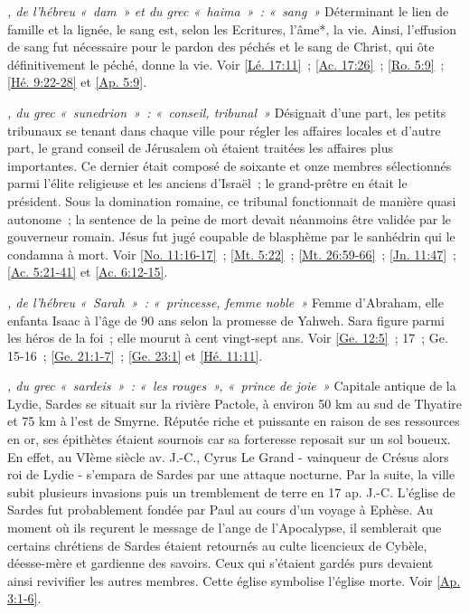 \begin{multicols}{2}
\textit{, de l'hébreu «~dam~» et du grec «~haima~»~: «~sang~»}\newline
Déterminant le lien de famille et la lignée, le sang est, selon les Ecritures, l'âme*, la vie. Ainsi, l'effusion de sang fut nécessaire pour le pardon des péchés et le sang de Christ, qui ôte définitivement le péché, donne la vie. Voir \vref{Lé. 17:11}~; \vref{Ac. 17:26}~; \vref{Ro. 5:9}~; \vref{Hé. 9:22-28} et \vref{Ap. 5:9}.

\textit{, du grec «~sunedrion~»~: «~conseil, tribunal~»}\newline
Désignait d'une part, les petits tribunaux se tenant dans chaque ville pour régler les affaires locales et d'autre part, le grand conseil de Jérusalem où étaient traitées les affaires plus importantes. Ce dernier était composé de soixante et onze membres sélectionnés parmi l'élite religieuse et les anciens d'Israël~; le grand-prêtre en était le président. Sous la domination romaine, ce tribunal fonctionnait de manière quasi autonome~; la sentence de la peine de mort devait néanmoins être validée par le gouverneur romain. Jésus fut jugé coupable de blasphème par le sanhédrin qui le condamna à mort. Voir \vref{No. 11:16-17}~; \vref{Mt. 5:22}~; \vref{Mt. 26:59-66}~; \vref{Jn. 11:47}~; \vref{Ac. 5:21-41} et \vref{Ac. 6:12-15}.

\textit{, de l'hébreu «~Sarah~»~: «~princesse, femme noble~»}\newline
Femme d'Abraham, elle enfanta Isaac à l'âge de 90 ans selon la promesse de Yahweh. Sara figure parmi les héros de la foi~; elle mourut à cent vingt-sept ans. Voir \vref{Ge. 12:5}~; 17~; Ge. 15-16~; \vref{Ge. 21:1-7}~; \vref{Ge. 23:1} et \vref{Hé. 11:11}.

\textit{, du grec «~sardeis~»~: «~les rouges~», «~prince de joie~»}\newline
Capitale antique de la Lydie, Sardes se situait sur la rivière Pactole, à environ 50 km au sud de Thyatire et 75 km à l'est de Smyrne. Réputée riche et puissante en raison de ses ressources en or, ses épithètes étaient sournois car sa forteresse reposait sur un sol boueux. En effet, au VIème siècle av. J.-C., Cyrus Le Grand - vainqueur de Crésus alors roi de Lydie - s'empara de Sardes par une attaque nocturne. Par la suite, la ville subit plusieurs invasions puis un tremblement de terre en 17 ap. J.-C. L'église de Sardes fut probablement fondée par Paul au cours d'un voyage à Ephèse. Au moment où ils reçurent le message de l'ange de l'Apocalypse, il semblerait que certains chrétiens de Sardes étaient retournés au culte licencieux de Cybèle, déesse-mère et gardienne des savoirs. Ceux qui s'étaient gardés purs devaient ainsi revivifier les autres membres. Cette église symbolise l'église morte. Voir \vref{Ap. 3:1-6}.


\end{multicols}
